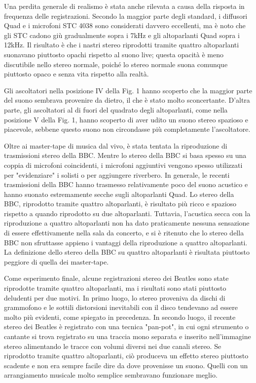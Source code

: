 \documentclass[11pt]{article}
\begin{document}
\begin{multicols*}{2}
Una perdita generale di realismo è stata anche rilevata a causa della risposta in frequenza delle registrazioni. Secondo la maggior parte degli standard, i diffusori Quad e i microfoni STC 4038 sono considerati davvero eccellenti, ma è noto che gli STC cadono giù gradualmente sopra i 7kHz e gli altoparlanti Quad sopra i 12kHz. Il risultato è che i nastri stereo riprodotti tramite quattro altoparlanti suonavano piuttosto opachi rispetto al suono live; questa opacità è meno discutibile nello stereo normale, poiché lo stereo normale suona comunque piuttosto opaco e senza vita rispetto alla realtà.

Gli ascoltatori nella posizione IV della Fig. 1 hanno scoperto che la maggior parte del suono sembrava provenire da dietro, il che è stato molto sconcertante. D'altra parte, gli ascoltatori al di fuori del quadrato degli altoparlanti, come nella posizione V della Fig. 1, hanno scoperto di aver udito un suono stereo spazioso e piacevole, sebbene questo suono non circondasse più completamente l’ascoltatore.

Oltre ai master-tape di musica dal vivo, è stata tentata la riproduzione di trasmissioni stereo della BBC. Mentre lo stereo della BBC si basa spesso su una coppia di microfoni coincidenti, i microfoni aggiuntivi vengono spesso utilizzati per "evidenziare" i solisti o per aggiungere riverbero. In generale, le recenti trasmissioni della BBC hanno trasmesso relativamente poco del suono acustico e hanno suonato estremamente secche sugli altoparlanti Quad. Lo stereo della BBC, riprodotto tramite quattro altoparlanti, è risultato più ricco e spazioso rispetto a quando riprodotto su due altoparlanti. Tuttavia, l'acustica secca con la riproduzione a quattro altoparlanti non ha dato praticamente nessuna sensazione di essere effettivamente nella sala da concerto, e si è ritenuto che lo stereo della BBC non sfruttasse appieno i vantaggi della riproduzione a quattro altoparlanti. La definizione dello stereo della BBC su quattro altoparlanti è risultata piuttosto peggiore di quella dei master-tape.

Come esperimento finale, alcune registrazioni stereo dei Beatles sono state riprodotte tramite quattro altoparlanti, ma i risultati sono stati piuttosto deludenti per due motivi. In primo luogo, lo stereo proveniva da dischi di grammofono e le sottili distorsioni inevitabili con il disco tendevano ad essere molto più evidenti, come spiegato in precedenza. In secondo luogo, il recente stereo dei Beatles è registrato con una tecnica "pan-pot", in cui ogni strumento o cantante si trova registrato su una traccia mono separata e inserito nell'immagine stereo alimentando le tracce con volumi diversi nei due canali stereo. Se riprodotto tramite quattro altoparlanti, ciò produceva un effetto stereo piuttosto scadente e non era sempre facile dire da dove provenisse un suono. Quelli con un arrangiamento musicale molto semplice sembravano funzionare meglio.


\end{multicols*}
\end{document}
